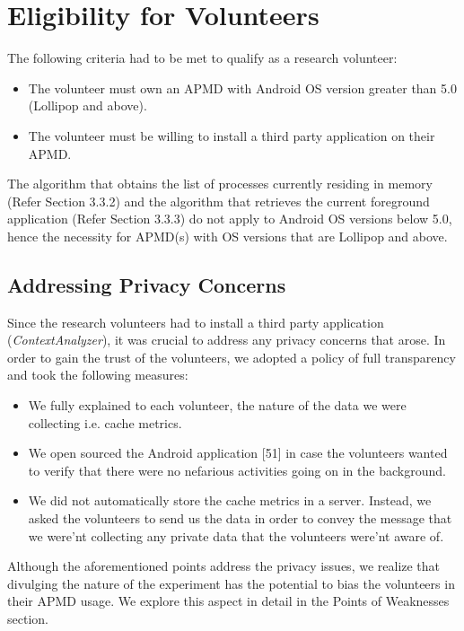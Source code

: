 \documentclass[12pt]{uthesis-v12}  %
\begin{document}
	\section{Eligibility for Volunteers}
		The following criteria had to be met to qualify as a research volunteer:
		
		\begin{itemize}
			\item The volunteer must own an APMD with Android OS version greater than 5.0 (Lollipop and above).
			\item The volunteer must be willing to install a third party application on their APMD.
		\end{itemize}
		
		The algorithm that obtains the list of processes currently residing in memory (Refer Section 3.3.2) and the algorithm that retrieves the current foreground application (Refer Section 3.3.3) do not apply to Android OS versions below 5.0, hence the necessity for APMD(s) with OS versions that are Lollipop and above.
		
		\subsection{Addressing Privacy Concerns}
			Since the research volunteers had to install a third party application ({\em ContextAnalyzer}), it was crucial to address any privacy concerns that arose. In order to gain the trust of the volunteers, we adopted a policy of full transparency and took the following measures:
			
			\begin{itemize}
				\item We fully explained to each volunteer, the nature of the data we were collecting i.e. cache metrics.
				\item We open sourced the Android application [51] in case the volunteers wanted to verify that there were no nefarious activities going on in the background.
				\item We did not automatically store the cache metrics in a server. Instead, we asked the volunteers to send us the data in order to convey the message that we were'nt collecting any private data that the volunteers were'nt aware of.
			\end{itemize}
			
			Although the aforementioned points address the privacy issues, we realize that divulging the nature of the experiment has the potential to bias the volunteers in their APMD usage. We explore this aspect in detail in the Points of Weaknesses section. 
	
\end{document}
